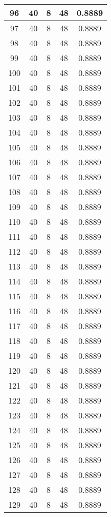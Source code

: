 \documentclass[letterpaper, 12pt]{article}
\begin{document}
\begin{longtable}{|c|c|c|c|c|}
\hline
96 & 40 & 8 & 48 & 0.8889 \\
\hline
97 & 40 & 8 & 48 & 0.8889 \\
\hline
98 & 40 & 8 & 48 & 0.8889 \\
\hline
99 & 40 & 8 & 48 & 0.8889 \\
\hline
100 & 40 & 8 & 48 & 0.8889 \\
\hline
101 & 40 & 8 & 48 & 0.8889 \\
\hline
102 & 40 & 8 & 48 & 0.8889 \\
\hline
103 & 40 & 8 & 48 & 0.8889 \\
\hline
104 & 40 & 8 & 48 & 0.8889 \\
\hline
105 & 40 & 8 & 48 & 0.8889 \\
\hline
106 & 40 & 8 & 48 & 0.8889 \\
\hline
107 & 40 & 8 & 48 & 0.8889 \\
\hline
108 & 40 & 8 & 48 & 0.8889 \\
\hline
109 & 40 & 8 & 48 & 0.8889 \\
\hline
110 & 40 & 8 & 48 & 0.8889 \\
\hline
111 & 40 & 8 & 48 & 0.8889 \\
\hline
112 & 40 & 8 & 48 & 0.8889 \\
\hline
113 & 40 & 8 & 48 & 0.8889 \\
\hline
114 & 40 & 8 & 48 & 0.8889 \\
\hline
115 & 40 & 8 & 48 & 0.8889 \\
\hline
116 & 40 & 8 & 48 & 0.8889 \\
\hline
117 & 40 & 8 & 48 & 0.8889 \\
\hline
118 & 40 & 8 & 48 & 0.8889 \\
\hline
119 & 40 & 8 & 48 & 0.8889 \\
\hline
120 & 40 & 8 & 48 & 0.8889 \\
\hline
121 & 40 & 8 & 48 & 0.8889 \\
\hline
122 & 40 & 8 & 48 & 0.8889 \\
\hline
123 & 40 & 8 & 48 & 0.8889 \\
\hline
124 & 40 & 8 & 48 & 0.8889 \\
\hline
125 & 40 & 8 & 48 & 0.8889 \\
\hline
126 & 40 & 8 & 48 & 0.8889 \\
\hline
127 & 40 & 8 & 48 & 0.8889 \\
\hline
128 & 40 & 8 & 48 & 0.8889 \\
\hline
129 & 40 & 8 & 48 & 0.8889 \\

\end{longtable}
\end{document}
